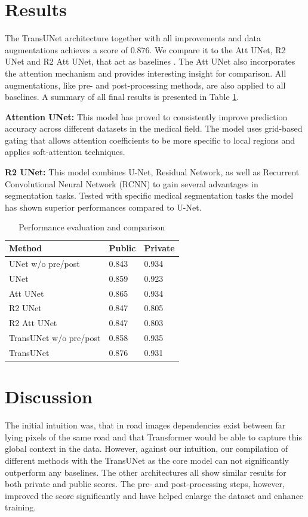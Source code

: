 \documentclass[10pt,conference,compsocconf]{IEEEtran}
\begin{document}
\section{Results}
The TransUNet architecture together with all improvements and data augmentations achieves a score of $0.876$.
We compare it to the Att UNet, R2 UNet and R2 Att UNet, that act as baselines \cite{DBLP:journals/corr/abs-1906-07160}. The Att UNet also incorporates the attention mechanism and provides interesting insight for comparison.  All augmentations, like pre- and post-processing methods, are also applied to all baselines. A summary of all final results is presented in Table \ref{tab:results}.

\textbf{Attention UNet:} This model \cite{oktay2018attention} has proved to consistently improve prediction accuracy across different datasets in the medical field. The model uses grid-based gating that allows attention coefficients to be more specific to local regions and applies soft-attention techniques.

\textbf{R2 UNet:} This model \cite{alom2018recurrent} combines U-Net, Residual Network, as well as Recurrent Convolutional Neural Network (RCNN) to gain several advantages in segmentation tasks. Tested with specific medical segmentation tasks the model has shown superior performances compared to U-Net. 

\setlength{\extrarowheight}{5pt}
\begin{table}[htbp]
\centering
   \begin{tabular}[c]{lll}
    \hline
    Method&Public&Private\\
    \hline
    UNet w/o pre/post & 0.843 & 0.934\\
    UNet & 0.859 & 0.923\\
    Att UNet & 0.865 & 0.934\\
    R2 UNet & 0.847 & 0.805\\
    R2 Att UNet & 0.847 & 0.803 \\
    \hline
    TransUNet w/o pre/post & 0.858 & 0.935 \\
    TransUNet & 0.876 & 0.931\\
    \hline
  \end{tabular}
  \caption{Performance evaluation and comparison}
  \label{tab:results}
\end{table}


\section{Discussion}
The initial intuition was, that in road images dependencies exist between far lying pixels of the same road and that Transformer would be able to capture this global context in the data. However, against our intuition, our compilation of different methods with the TransUNet as the core model can not significantly outperform any baselines. The other architectures all show similar results for both private and public scores. The pre- and post-processing steps, however, improved the score significantly and have helped enlarge the dataset and enhance training.
\end{document}

